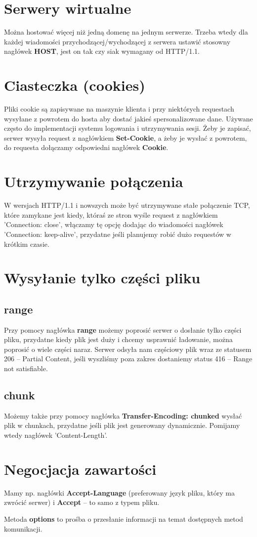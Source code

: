 \section{Serwery wirtualne}
Można hostować więcej niż jedną domenę na jednym serwerze. Trzeba wtedy dla każdej wiadomości przychodzącej/wychodzącej z serwera ustawić stosowny nagłówek \textbf{HOST}, jest on tak czy siak wymagany od HTTP/1.1.

\section{Ciasteczka (cookies)}
Pliki cookie są zapisywane na maszynie klienta i przy niektórych requestach wysyłane z powrotem do hosta aby dostać jakieś spersonalizowane dane. Używane często do implementacji systemu logowania i utrzymywania sesji. Żeby je zapisać, serwer wysyła request z nagłówkiem \textbf{Set-Cookie}, a żeby je wysłać z powrotem, do requesta dołączamy odpowiedni nagłówek \textbf{Cookie}.

\section{Utrzymywanie połączenia}
W wersjach HTTP/1.1 i nowszych może być utrzymywane stałe połączenie TCP, które zamykane jest kiedy, któraś ze stron wyśle request z nagłówkiem 'Connection: close', włączamy tę opcję dodając do wiadomości nagłówek 'Connection: keep-alive', przydatne jeśli planujemy robić dużo requestów w krótkim czasie.

\section{Wysyłanie tylko części pliku}
\subsection{range}
Przy pomocy nagłówka \textbf{range} możemy poprosić serwer o dosłanie tylko części pliku, przydatne kiedy plik jest duży i chcemy usprawnić ładowanie, można poprosić o wiele części naraz. Serwer odsyła nam częściowy plik wraz ze statusem 206 -- Partial Content, jeśli wyszliśmy poza zakres dostaniemy status 416 -- Range not satisfiable.

\subsection{chunk}
Możemy także przy pomocy nagłówka \textbf{Transfer-Encoding: chunked} wysłać plik w chunkach, przydatne jeśli plik jest generowany dynamicznie. Pomijamy wtedy nagłówek 'Content-Length'.

\section{Negocjacja zawartości}
Mamy np. nagłówki \textbf{Accept-Language} (preferowany język pliku, który ma zwrócić serwer) i \textbf{Accept} -- to samo z typem pliku.

Metoda \textbf{options} to prośba o przesłanie informacji na temat dostępnych metod komunikacji.
